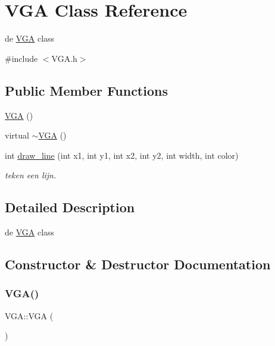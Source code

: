 \hypertarget{class_v_g_a}{}\section{V\+GA Class Reference}
\label{class_v_g_a}


de \mbox{\hyperlink{class_v_g_a}{V\+GA}} class  




{\ttfamily \#include $<$V\+G\+A.\+h$>$}

\subsection*{Public Member Functions}
\begin{DoxyCompactItemize}
\item 
\mbox{\hyperlink{class_v_g_a_a6058289a2058e6fcf3f3173272b02631}{V\+GA}} ()
\item 
virtual \mbox{\hyperlink{class_v_g_a_a668d9721425a9cae546a822ae6eeb586}{$\sim$\+V\+GA}} ()
\item 
int \mbox{\hyperlink{class_v_g_a_abc1cae8d5ea46f564874e3061fc95964}{draw\+\_\+line}} (int x1, int y1, int x2, int y2, int width, int color)
\begin{DoxyCompactList}\small\item\em teken een lijn. \end{DoxyCompactList}\end{DoxyCompactItemize}


\subsection{Detailed Description}
de \mbox{\hyperlink{class_v_g_a}{V\+GA}} class 

\subsection{Constructor \& Destructor Documentation}
\mbox{\label{class_v_g_a_a6058289a2058e6fcf3f3173272b02631}} 
\subsubsection{\texorpdfstring{V\+G\+A()}{VGA()}}
{\footnotesize\ttfamily V\+G\+A\+::\+V\+GA (\begin{DoxyParamCaption}{ }\end{DoxyParamCaption})}

